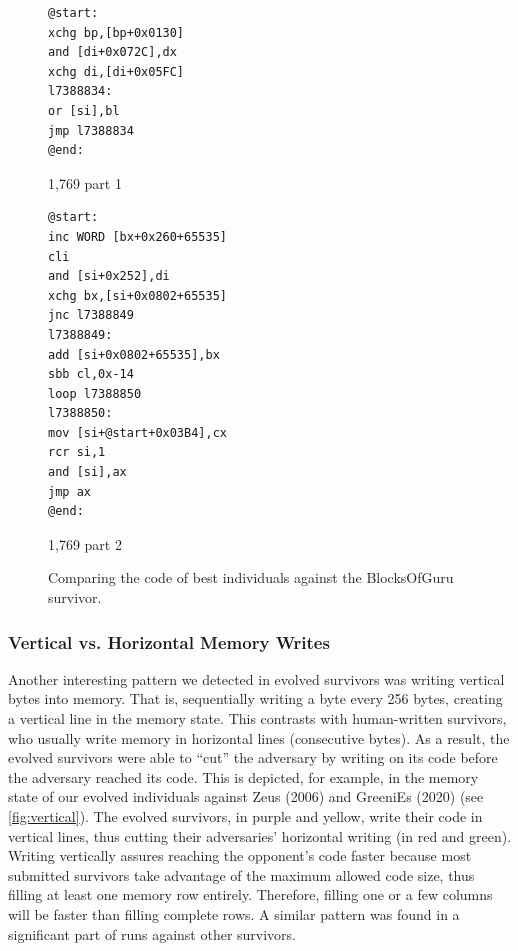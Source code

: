 \documentclass[dvipsnames, format=sigconf]{acmart}
\begin{document}
\begin{figure}
\captionsetup{type=lstlisting}
\centering
\begin{sublstlisting}[b]{0.38\linewidth}
\begin{lstlisting}
@start:
xchg bp,[bp+0x0130]
and [di+0x072C],dx
xchg di,[di+0x05FC]
l7388834:
or [si],bl
jmp l7388834
@end:
\end{lstlisting}
\caption{1,769 part 1}
\end{sublstlisting}
\qquad
\begin{sublstlisting}[b]{0.5\linewidth}
\begin{lstlisting}
@start:
inc WORD [bx+0x260+65535]
cli
and [si+0x252],di
xchg bx,[si+0x0802+65535]
jnc l7388849
l7388849:
add [si+0x0802+65535],bx
sbb cl,0x-14
loop l7388850
l7388850:
mov [si+@start+0x03B4],cx
rcr si,1
and [si],ax
jmp ax
@end:
\end{lstlisting}
\caption{1,769 part 2}
\end{sublstlisting}
\caption{Comparing the code of best individuals against the BlocksOfGuru survivor.}
\label{lst:BlocksOfGuru:b}
\end{figure}

\subsubsection{Vertical vs. Horizontal Memory Writes}
\label{vertical}
Another interesting pattern we detected in evolved survivors was writing vertical bytes into memory. That is, sequentially writing a byte every 256 bytes, creating a vertical line in the memory state. This contrasts with human-written survivors, who usually write memory in horizontal lines (consecutive bytes). As a result, the evolved survivors were able to ``cut'' the adversary by writing on its code before the adversary reached its code. This is depicted, for example, in the memory state of our evolved individuals against Zeus (2006) and GreeniEs (2020) (see \autoref{fig:vertical}). The evolved survivors, in purple and yellow, write their code in vertical lines, thus cutting their adversaries' horizontal writing (in red and green). Writing vertically assures reaching the opponent's code faster because most submitted survivors take advantage of the maximum allowed code size, thus filling at least one memory row entirely. Therefore, filling one or a few columns will be faster than filling complete rows. A similar pattern was found in a significant part of runs against other survivors.
\end{document}
